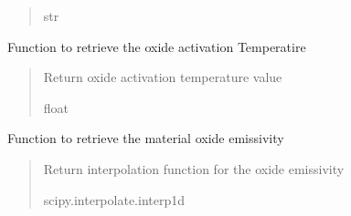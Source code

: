 \documentclass[letterpaper,10pt,english]{sphinxmanual}
\begin{document}
\begin{fulllineitems}
\begin{fulllineitems}
\begin{quote}
\begin{description}
\sphinxAtStartPar
str

\end{description}\end{quote}

\end{fulllineitems}


\begin{fulllineitems}
\label{\detokenize{modules:material.Material.material_oxideActivationTemperature}}
\pysigstartsignatures
{}
\pysigstopsignatures
\sphinxAtStartPar
Function to retrieve the oxide activation Temperatire
\begin{quote}\begin{description}
\sphinxAtStartPar
{} \textendash{} Return oxide activation temperature value

\sphinxAtStartPar
float

\end{description}\end{quote}

\end{fulllineitems}


\begin{fulllineitems}
\label{\detokenize{modules:material.Material.material_oxideEmissivity}}
\pysigstartsignatures
{}
\pysigstopsignatures
\sphinxAtStartPar
Function to retrieve the material oxide emissivity
\begin{quote}\begin{description}
\sphinxAtStartPar
{} \textendash{} Return interpolation function for the oxide emissivity

\sphinxAtStartPar
scipy.interpolate.interp1d

\end{description}\end{quote}


\end{fulllineitems}
\end{fulllineitems}
\end{document}

